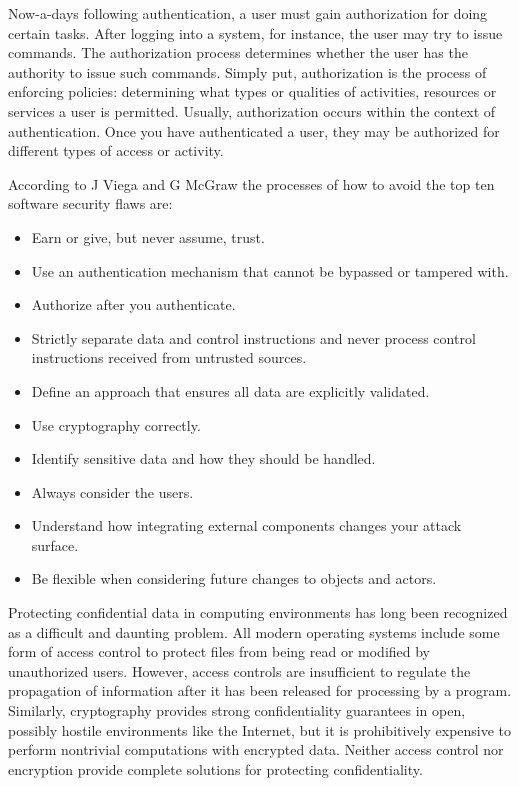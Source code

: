Now-a-days following authentication, a user must gain authorization for doing certain tasks. After logging into a system, for instance, the user may try to issue commands. The authorization process determines whether the user has the authority to issue such commands. Simply put, authorization is the process of enforcing policies: determining what types or qualities of activities, resources or services a user is permitted. Usually, authorization occurs within the context of authentication. Once you have authenticated a user, they may be authorized for different types of access or activity.

According to J Viega and G McGraw \cite{ref_92_viega2001building} the processes of how to avoid the top ten software security flaws are:
\begin{itemize}
	\item Earn or give, but never assume, trust.
	
	\item Use an authentication mechanism that
	cannot be bypassed or tampered with.
	
	\item Authorize after you authenticate.
	
	\item Strictly separate data and control
	instructions and never process control
	instructions received from untrusted sources.
	
	\item Define an approach that ensures all data are
	explicitly validated.

	\item Use cryptography correctly.
	 
	\item Identify sensitive data and how they should
	be handled.
	
	\item Always consider the users.

	\item Understand how integrating external
	components changes your attack surface.
	
	\item Be flexible when considering future changes
	to objects and actors.
	
	
\end{itemize}

Protecting confidential data in computing environments has long been recognized as a difficult and daunting problem. All modern operating systems include some form of access control to protect files from being read or modified by unauthorized users. However, access controls are insufficient to regulate the propagation of information after it has been released for processing by a program. Similarly,
cryptography provides strong confidentiality guarantees in open, possibly hostile environments like the Internet, but it is prohibitively expensive to perform nontrivial computations with encrypted data. Neither access control nor encryption
provide complete solutions for protecting confidentiality.

